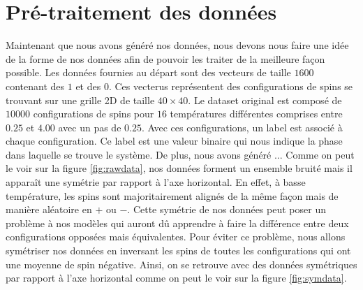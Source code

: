 \documentclass[11pt, parskip=half]{scrartcl} %
\begin{document}
\section{Pré-traitement des données}
Maintenant que nous avons généré nos données, nous devons nous faire une idée de la forme de nos données afin de pouvoir les traiter de la meilleure façon possible.
Les données fournies au départ sont des vecteurs de taille $1600$ contenant des $1$ et des $0$. Ces vecterus représentent des configurations de spins se trouvant sur une grille 2D de taille $40 \times 40$. Le dataset original est composé de $10000$ configurations de spins pour $16$ températures différentes comprises entre $0.25$ et $4.00$ avec un pas de $0.25$.
Avec ces configurations, un label est associé à chaque configuration. Ce label est une valeur binaire qui nous indique la phase dans laquelle se trouve le système. 
De plus, nous avons généré ...
Comme on peut le voir sur la figure \ref{fig:rawdata}, nos données forment un ensemble bruité mais il apparaît une symétrie par rapport à l'axe horizontal. En effet, à basse température, les spins sont majoritairement alignés de la même façon mais de manière aléatoire en $+$ ou $-$.
Cette symétrie de nos données peut poser un problème à nos modèles qui auront dû apprendre à faire la différence entre deux configurations opposées mais équivalentes. Pour éviter ce problème, nous allons symétriser nos données en inversant les spins de toutes les configurations qui ont une moyenne de spin  négative. 
Ainsi, on se retrouve avec des données symétriques par rapport à l'axe horizontal comme on peut le voir sur la figure \ref{fig:symdata}.
\end{document}

